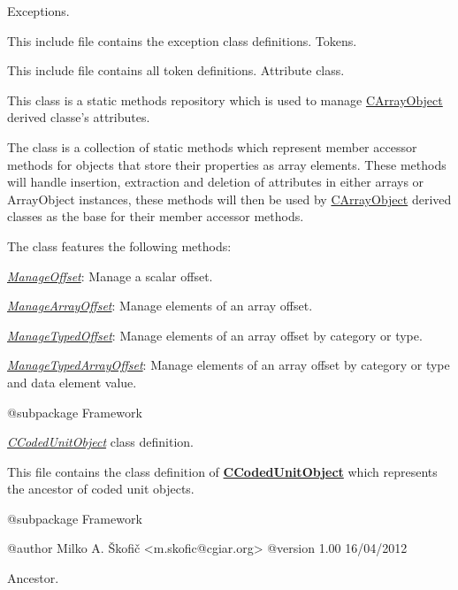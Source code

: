 Exceptions.

This include file contains the exception class definitions. Tokens.

This include file contains all token definitions. Attribute class.

This class is a static methods repository which is used to manage \hyperlink{class_c_array_object}{C\-Array\-Object} derived classe's attributes.

The class is a collection of static methods which represent member accessor methods for objects that store their properties as array elements. These methods will handle insertion, extraction and deletion of attributes in either arrays or Array\-Object instances, these methods will then be used by \hyperlink{class_c_array_object}{C\-Array\-Object} derived classes as the base for their member accessor methods.

The class features the following methods\-:


\begin{DoxyItemize}
\item {\itshape \hyperlink{}{Manage\-Offset}}\-: Manage a scalar offset. 
\item {\itshape \hyperlink{}{Manage\-Array\-Offset}}\-: Manage elements of an array offset. 
\item {\itshape \hyperlink{}{Manage\-Typed\-Offset}}\-: Manage elements of an array offset by category or type. 
\item {\itshape \hyperlink{}{Manage\-Typed\-Array\-Offset}}\-: Manage elements of an array offset by category or type and data element value. 
\end{DoxyItemize}

\begin{DoxyVerb} @subpackage        Framework\end{DoxyVerb}


{\itshape \hyperlink{class_c_coded_unit_object}{C\-Coded\-Unit\-Object}} class definition.

This file contains the class definition of {\bfseries \hyperlink{class_c_coded_unit_object}{C\-Coded\-Unit\-Object}} which represents the ancestor of coded unit objects.

\begin{DoxyVerb} @subpackage        Framework

 @author            Milko A. Škofič <m.skofic@cgiar.org>
 @version   1.00 16/04/2012\end{DoxyVerb}


Ancestor.

